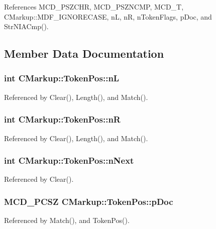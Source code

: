 References MCD\_\-PSZCHR, MCD\_\-PSZNCMP, MCD\_\-T, CMarkup::MDF\_\-IGNORECASE, nL, nR, nTokenFlags, pDoc, and StrNIACmp().

\subsection{Member Data Documentation}
\subsubsection[nL]{\setlength{\rightskip}{0pt plus 5cm}int {\bf CMarkup::TokenPos::nL}}\label{structCMarkup_1_1TokenPos_c4c71680b3f09845b5346bf1285a214f}




Referenced by Clear(), Length(), and Match().
\subsubsection[nR]{\setlength{\rightskip}{0pt plus 5cm}int {\bf CMarkup::TokenPos::nR}}\label{structCMarkup_1_1TokenPos_fb58afc56664b9646fc79b9ec2a51b10}




Referenced by Clear(), Length(), and Match().
\subsubsection[nNext]{\setlength{\rightskip}{0pt plus 5cm}int {\bf CMarkup::TokenPos::nNext}}\label{structCMarkup_1_1TokenPos_72b20974f7b55aa5d804a769f8a3f985}




Referenced by Clear().
\subsubsection[pDoc]{\setlength{\rightskip}{0pt plus 5cm}MCD\_\-PCSZ {\bf CMarkup::TokenPos::pDoc}}\label{structCMarkup_1_1TokenPos_90a1052c162afcd07fc3974b95888a7e}




Referenced by Match(), and TokenPos().
